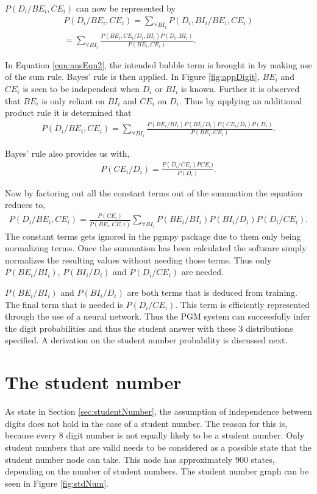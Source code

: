 $P(D_i/BE_i,CE_i)$ can now be represented by
\begin{align}
  P(D_i/BE_i,CE_i)	=  \sum_{\forall BI_i}^{}  P(D_i,BI_i/BE_i,CE_i)\\
  					=  \sum_{\forall BI_i}^{}  \frac{P(BE_i,CE_i/D_i,BI_i)P(D_i,BI_i)}{P(BE_i,CE_i)}.
\label{eqn:ansEqn2}
\end{align}

In Equation \ref{eqn:ansEqn2}, the intended bubble term is brought in by making use of the sum rule. Bayes' rule is then applied. In Figure \ref{fig:appDigit}, $BE_i$ and $CE_i$ is seen to be independent when $D_i$ or $BI_i$ is known. Further it is observed that $BE_i$ is only reliant on $BI_i$ and $CE_i$ on $D_i$. Thus by applying an additional product rule it is determined that
\begin{align}
  P(D_i/BE_i,CE_i) =  \sum_{\forall BI_i}^{}\frac{P(BE_i/BI_i)P(BI_i/D_i)P(CE_i/D_i)P(D_i)}{P(BE_i,CE_i)}.
\label{eqn:ansEqn3}
\end{align}

Bayes' rule also provides us with,
\begin{align}
  P(CE_i/D_i)	=  \frac{P(D_i/CE_i)PCE_i)}{P(D_i)}.
\label{eqn:ansEqn4}
\end{align}

Now by factoring out all the constant terms out of the summation the equation reduces to,
\begin{align}
  P(D_i/BE_i,CE_i) =  \frac{P(CE_i)}{P(BE_i,CE,i)}\sum_{\forall BI_i}^{}P(BE_i/BI_i)P(BI_i/D_i)P(D_i/CE_i).
\label{eqn:ansEqn5}
\end{align}
The constant terms gets ignored in the pgmpy package due to them only being normalizing terms. Once the summation has been calculated the software simply normalizes the resulting values without needing those terms. Thus only $P(BE_i/BI_i)$, $P(BI_i/D_i)$ and $P(D_i/CE_i)$ are needed.

$P(BE_i/BI_i)$ and  $P(BI_i/D_i)$ are both terms that is deduced from training. The final term that is needed is $P(D_i/CE_i)$. This term is efficiently represented through the use of a neural network. Thus the PGM system can successfully infer the digit probabilities and thus the student answer with these 3 distributions specified. A derivation on the student number probability is discussed next.

\section{The student number}
As state in Section \ref{sec:studentNumber}, the assumption of independence between digits does not hold in the case of a student number. The reason for this is, because every 8 digit number is not equally likely to be a student number. Only student numbers that are valid needs to be considered as a possible state that the student number node can take. This node has approximately $900$ states, depending on the number of student numbers. The student number graph can be seen in Figure \ref{fig:stdNum}. 

